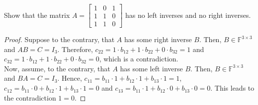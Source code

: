 \documentclass[12pt]{article}
\newenvironment{problem}[2][Problem]{\begin{trivlist} \item[\hskip \labelsep {\bfseries #1}\hskip \labelsep {\bfseries #2.}]}{\end{trivlist}}
\begin{document}
    \begin{problem}{1.13} Show that the matrix $A=\begin{bmatrix} 1 & 0 & 1\\ 1 & 1 & 0\\ 1 & 1 & 0 \end{bmatrix}$ has no left inverses and no right inverses.
    \begin{proof}
      Suppose to the contrary, that $A$ has some right inverse $B$. Then, $B\in \mathbb{F}^{3\times 3}$ and $AB=C=I_{3}$. Therefore, $c_{22} = 1\cdot b_{12} + 1\cdot b_{22} + 0\cdot b_{32} = 1$ and $c_{32} = 1\cdot b_{12} + 1\cdot b_{22} + 0\cdot b_{32} = 0$, which is a contradiction.\\
      Now, assume, to the contrary, that $A$ has some left inverse $B$. Then, $B\in \mathbb{F}^{3\times 3}$ and $BA = C = I_{3}$. Hence, $c_{11} = b_{11}\cdot 1 + b_{12}\cdot 1 + b_{13}\cdot 1 = 1$, $c_{12} =  b_{11}\cdot 0 + b_{12}\cdot 1 + b_{13}\cdot 1 = 0$ and $c_{13} = b_{11}\cdot 1 + b_{12}\cdot 0+ b_{13}\cdot 0 = 0$. This leads to the contradiction $1=0$.
    \end{proof}
    \end{problem}
\end{document}
